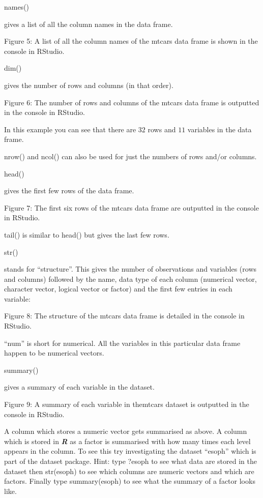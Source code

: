 \documentclass[
]{book}
\begin{document}
names()

gives a list of all the column names in the data frame.

Figure 5: A list of all the column names of the mtcars data frame is shown in the console in RStudio.

dim()

gives the number of rows and columns (in that order).

Figure 6: The number of rows and columns of the mtcars data frame is outputted in the console in RStudio.

In this example you can see that there are \(32\) rows and \(11\) variables in the data frame.

nrow() and ncol() can also be used for just the numbers of rows and/or columns.

head()

gives the first few rows of the data frame.

Figure 7: The first six rows of the mtcars data frame are outputted in the console in RStudio.

tail() is similar to head() but gives the last few rows.

str()

stands for ``structure''. This gives the number of observations and variables (rows and columns) followed by the name, data type of each column (numerical vector, character vector, logical vector or factor) and the first few entries in each variable:

Figure 8: The structure of the mtcars data frame is detailed in the console in RStudio.

``num'' is short for numerical. All the variables in this particular data frame happen to be numerical vectors.

summary()

gives a summary of each variable in the dataset.

Figure 9: A summary of each variable in themtcars dataset is outputted in the console in RStudio.

A column which stores a numeric vector gets summarised as above. A column which is stored in \textbf{\emph{R}} as a factor is summarised with how many times each level appears in the column. To see this try investigating the dataset ``esoph'' which is part of the dataset package. Hint: type ?esoph to see what data are stored in the dataset then str(esoph) to see which columns are numeric vectors and which are factors. Finally type summary(esoph) to see what the summary of a factor looks like.
\end{document}
